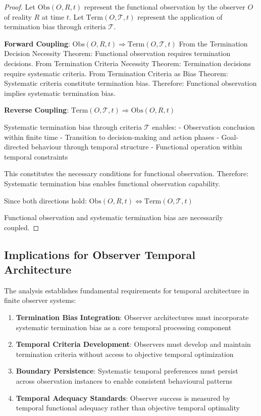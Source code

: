 \documentclass[12pt,a4paper]{article}
\begin{document}
\begin{proof}
Let $\text{Obs}(O, R, t)$ represent the functional observation by the observer $O$ of reality $R$ at time $t$.
Let $\text{Term}(O, \mathcal{T}, t)$ represent the application of termination bias through criteria $\mathcal{T}$.

\textbf{Forward Coupling}: $\text{Obs}(O, R, t) \Rightarrow \text{Term}(O, \mathcal{T}, t)$
From the Termination Decision Necessity Theorem: Functional observation requires termination decisions.
From Termination Criteria Necessity Theorem: Termination decisions require systematic criteria.
From Termination Criteria as Bias Theorem: Systematic criteria constitute termination bias.
Therefore: Functional observation implies systematic termination bias.

\textbf{Reverse Coupling}: $\text{Term}(O, \mathcal{T}, t) \Rightarrow \text{Obs}(O, R, t)$

Systematic termination bias through criteria $\mathcal{T}$ enables:
- Observation conclusion within finite time
- Transition to decision-making and action phases
- Goal-directed behaviour through temporal structure
- Functional operation within temporal constraints

This constitutes the necessary conditions for functional observation.
Therefore: Systematic termination bias enables functional observation capability.

Since both directions hold: $\text{Obs}(O, R, t) \Leftrightarrow \text{Term}(O, \mathcal{T}, t)$

Functional observation and systematic termination bias are necessarily coupled.
\end{proof}

\subsection{Implications for Observer Temporal Architecture}

The analysis establishes fundamental requirements for temporal architecture in finite observer systems:

\begin{enumerate}
\item \textbf{Termination Bias Integration}: Observer architectures must incorporate systematic termination bias as a core temporal processing component
\item \textbf{Temporal Criteria Development}: Observers must develop and maintain termination criteria without access to objective temporal optimization
\item \textbf{Boundary Persistence}: Systematic temporal preferences must persist across observation instances to enable consistent behavioural patterns
\item \textbf{Temporal Adequacy Standards}: Observer success is measured by temporal functional adequacy rather than objective temporal optimality
\end{enumerate}
\end{document}
